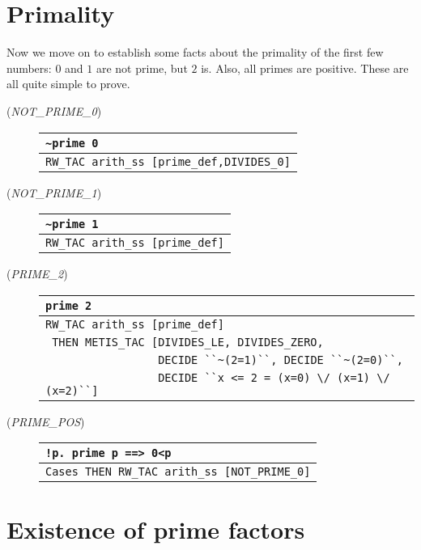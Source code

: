 \section{Primality}

Now we move on to establish some facts about the primality of the
first few numbers: $0$ and $1$ are not prime, but $2$ is. Also, all
primes are positive. These are all quite simple to prove.

\begin{description}

\item [\small{({\it NOT\_PRIME\_0\/})}]
\begin{tabular}[t]{l}
\verb+~prime 0+ \\ \hline
\verb+RW_TAC arith_ss [prime_def,DIVIDES_0]+ \\
\end{tabular}

\item [\small{({\it NOT\_PRIME\_1\/})}]
\begin{tabular}[t]{l}
\verb+~prime 1+ \\ \hline
\verb+RW_TAC arith_ss [prime_def]+ \\
\end{tabular}

\item [\small{({\it PRIME\_2\/})}]
\begin{tabular}[t]{l}
\verb+prime 2+ \\ \hline
\verb+RW_TAC arith_ss [prime_def]+ \\
\verb+ THEN METIS_TAC [DIVIDES_LE, DIVIDES_ZERO,+ \\
\verb+                 DECIDE ``~(2=1)``, DECIDE ``~(2=0)``,+ \\
\verb+                 DECIDE ``x <= 2 = (x=0) \/ (x=1) \/ (x=2)``]+ \\
\end{tabular}

\item [\small{({\it PRIME\_POS\/})}]
\begin{tabular}[t]{l}
\verb+!p. prime p ==> 0<p+ \\ \hline
\verb+Cases THEN RW_TAC arith_ss [NOT_PRIME_0]+ \\
\end{tabular}
\end{description}

\section{Existence of prime factors}

